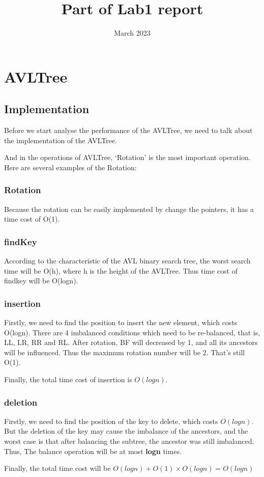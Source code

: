 \documentclass{article}
\title{Part of Lab1 report}
\date{March 2023}
\begin{document}
\maketitle

\section{AVLTree}

\subsection{Implementation}
\par
Before we start analyse the performance of the AVLTree, we need to talk about the implementation of the AVLTree.
\par
And in the operations of AVLTree, `Rotation' is the most important operation. Here are several examples of the Rotation:
\par
\subsubsection{Rotation}
Because the rotation can be easily implemented by change the pointers, it has a time cost of O(1).
\subsubsection{findKey}
\par
According to the characteristic of the AVL binary search tree, the worst search time will be O(h), where h is the height of the AVLTree. Thus time cost of findkey will be O(logn). 


\subsubsection{insertion}
\par
Firstly, we need to find the position to insert the new element, which costs O(logn). There are 4 imbalanced conditions which need to be re-balanced, that is, LL, LR, RR and RL. After rotation, BF will decreased by 1, and all its ancestors will be influenced. Thus the maximum rotation number will be 2. That's still O(1).
\par
Finally, the total time cost of insertion is $O(logn)$.

\subsubsection{deletion}
Firstly, we need to find the position of the key to delete, which costs $O(logn)$. But the deletion of the key may cause the imbalance of the ancestors, and the worst case is that after balancing the subtree, the ancestor was still imbalanced. Thus, The balance operation will be at most \textbf{logn} times.
\par
Finally, the total time cost will be $O(log n) + O(1)\times O(logn)=O(logn)$
\end{document}
